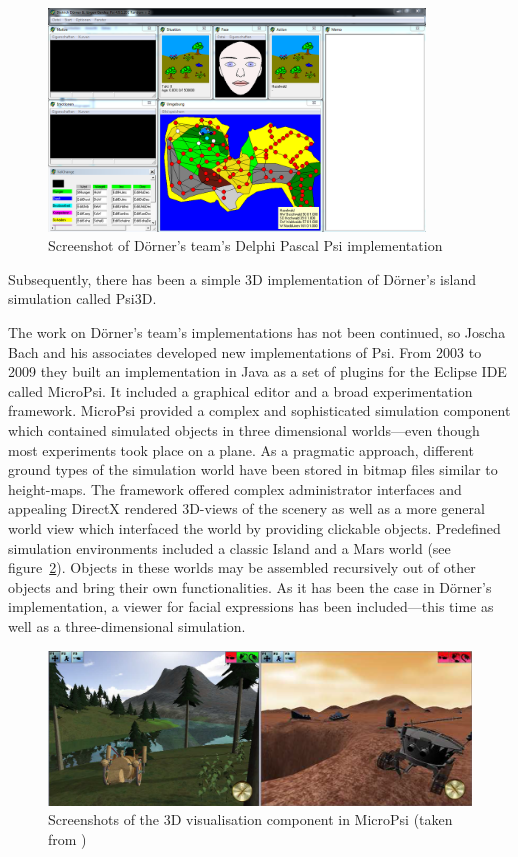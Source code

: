 \begin{figure}[h]
  \centering
    \includegraphics[width=10cm]{graphics/psi_screen1}
  \caption{Screenshot of Dörner's team's Delphi Pascal Psi implementation}
  \label{psi_screen}
\end{figure}


Subsequently, there has been a simple 3D implementation of Dörner's island simulation called Psi3D.


The work on Dörner's team's implementations has not been continued, so Joscha Bach and his associates developed new implementations of Psi. From 2003 to 2009 they built an implementation in Java as a set of plugins for the Eclipse IDE called MicroPsi. It included a graphical editor and a broad experimentation framework. MicroPsi provided a complex and sophisticated simulation component which contained simulated objects in three dimensional worlds---even though most experiments took place on a plane. As a pragmatic approach, different ground types of the simulation world have been stored in bitmap files similar to height-maps. The framework offered complex administrator interfaces and appealing DirectX rendered 3D-views of the scenery as well as a more general world view which interfaced the world by providing clickable objects. Predefined simulation environments included a classic Island and a Mars world (see figure~\ref{micropsi_3d_screen}). Objects in these worlds may be assembled recursively out of other objects and bring their own functionalities. As it has been the case in Dörner's implementation, a viewer for facial expressions has been included---this time as well as a three-dimensional simulation.~\cite{Bach:2009:PSI:1611304}


\begin{figure}[h]
  \centering
    \includegraphics[width=14cm]{graphics/micropsi_3d_screen}
  \caption{Screenshots of the 3D visualisation component in MicroPsi (taken from \cite{Bach:2009:PSI:1611304})}
  \label{micropsi_3d_screen}
\end{figure}

